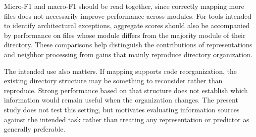 Micro-F1 and macro-F1 should be read together, since correctly mapping more files does not necessarily improve performance across modules. For tools intended to identify architectural exceptions, aggregate scores should also be accompanied by performance on files whose module differs from the majority module of their directory. These comparisons help distinguish the contributions of representations and neighbor processing from gains that mainly reproduce directory organization.

The intended use also matters. If mapping supports code reorganization, the existing directory structure may be something to reconsider rather than reproduce. Strong performance based on that structure does not establish which information would remain useful when the organization changes. The present study does not test this setting, but motivates evaluating information sources against the intended task rather than treating any representation or predictor as generally preferable.

 
